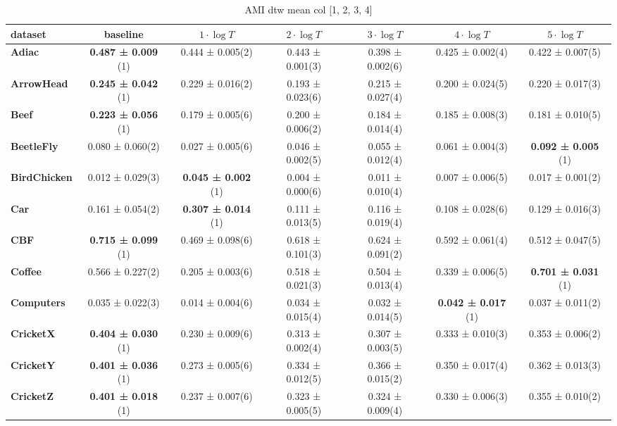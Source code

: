     \begin{table}[ht]
    \caption{AMI dtw mean col [1, 2, 3, 4]} 
    \begin{adjustbox}{width=\textwidth}
    \begin{tabular}{lcccccc}
    \hline
    dataset & baseline & \textbf{$1\cdot \log{T}$} & \textbf{$2\cdot \log{T}$} & \textbf{$3\cdot \log{T}$} & \textbf{$4\cdot \log{T}$} & \textbf{$5\cdot \log{T}$} \\ \hline
    \textbf{Adiac} & \textbf{0.487 ± 0.009} (1) & 0.444 ± 0.005(2) & 0.443 ± 0.001(3) & 0.398 ± 0.002(6) & 0.425 ± 0.002(4) & 0.422 ± 0.007(5) \\
    \textbf{ArrowHead} & \textbf{0.245 ± 0.042} (1) & 0.229 ± 0.016(2) & 0.193 ± 0.023(6) & 0.215 ± 0.027(4) & 0.200 ± 0.024(5) & 0.220 ± 0.017(3) \\
    \textbf{Beef} & \textbf{0.223 ± 0.056} (1) & 0.179 ± 0.005(6) & 0.200 ± 0.006(2) & 0.184 ± 0.014(4) & 0.185 ± 0.008(3) & 0.181 ± 0.010(5) \\
    \textbf{BeetleFly} & 0.080 ± 0.060(2) & 0.027 ± 0.005(6) & 0.046 ± 0.002(5) & 0.055 ± 0.012(4) & 0.061 ± 0.004(3) & \textbf{0.092 ± 0.005} (1) \\
    \textbf{BirdChicken} & 0.012 ± 0.029(3) & \textbf{0.045 ± 0.002} (1) & 0.004 ± 0.000(6) & 0.011 ± 0.010(4) & 0.007 ± 0.006(5) & 0.017 ± 0.001(2) \\
    \textbf{Car} & 0.161 ± 0.054(2) & \textbf{0.307 ± 0.014} (1) & 0.111 ± 0.013(5) & 0.116 ± 0.019(4) & 0.108 ± 0.028(6) & 0.129 ± 0.016(3) \\
    \textbf{CBF} & \textbf{0.715 ± 0.099} (1) & 0.469 ± 0.098(6) & 0.618 ± 0.101(3) & 0.624 ± 0.091(2) & 0.592 ± 0.061(4) & 0.512 ± 0.047(5) \\
    \textbf{Coffee} & 0.566 ± 0.227(2) & 0.205 ± 0.003(6) & 0.518 ± 0.021(3) & 0.504 ± 0.013(4) & 0.339 ± 0.006(5) & \textbf{0.701 ± 0.031} (1) \\
    \textbf{Computers} & 0.035 ± 0.022(3) & 0.014 ± 0.004(6) & 0.034 ± 0.015(4) & 0.032 ± 0.014(5) & \textbf{0.042 ± 0.017} (1) & 0.037 ± 0.011(2) \\
    \textbf{CricketX} & \textbf{0.404 ± 0.030} (1) & 0.230 ± 0.009(6) & 0.313 ± 0.002(4) & 0.307 ± 0.003(5) & 0.333 ± 0.010(3) & 0.353 ± 0.006(2) \\
    \textbf{CricketY} & \textbf{0.401 ± 0.036} (1) & 0.273 ± 0.005(6) & 0.334 ± 0.012(5) & 0.366 ± 0.015(2) & 0.350 ± 0.017(4) & 0.362 ± 0.013(3) \\
    \textbf{CricketZ} & \textbf{0.401 ± 0.018} (1) & 0.237 ± 0.007(6) & 0.323 ± 0.005(5) & 0.324 ± 0.009(4) & 0.330 ± 0.006(3) & 0.355 ± 0.010(2) \\

\end{tabular}
\end{adjustbox}
\end{table}
